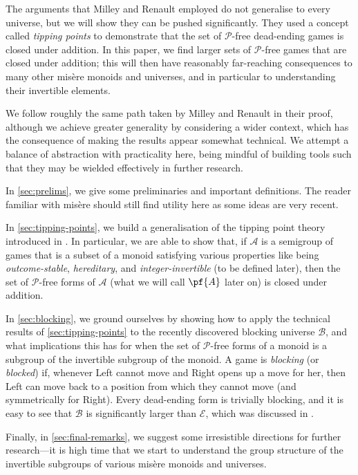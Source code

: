 \documentclass[11pt]{article}
\theoremstyle{definition}
\newcommand{\set}[1]{\mathcal{#1}}
\begin{document}
The arguments that Milley and Renault employed do not generalise to every
universe, but we will show they can be pushed significantly. They used a
concept called \emph{tipping points} to demonstrate that the set of
$\mathscr{P}$-free dead-ending games is closed under addition. In this paper,
we find larger sets of $\mathscr{P}$-free games that are closed under addition;
this will then have reasonably far-reaching consequences to many other mis\`ere
monoids and universes, and in particular to understanding their invertible
elements.

We follow roughly the same path taken by Milley and Renault in their proof,
although we achieve greater generality by considering a wider context, which
has the consequence of making the results appear somewhat technical. We attempt
a balance of abstraction with practicality here, being mindful of building
tools such that they may be wielded effectively in further research.

In \cref{sec:prelims}, we give some preliminaries and important definitions.
The reader familiar with mis\`ere should still find utility here as some ideas
are very recent.

In \cref{sec:tipping-points}, we build a generalisation of the tipping point
theory introduced in \cite{milley.renault:invertible}. In particular, we are
able to show that, if $\set{A}$ is a semigroup of games that is a subset of a
monoid satisfying various properties like being \emph{outcome-stable},
\emph{hereditary}, and \emph{integer-invertible} (to be defined later), then
the set of $\mathscr{P}$-free forms of $\set{A}$ (what we will call $\pf{A}$
later on) is closed under addition.

In \cref{sec:blocking}, we ground ourselves by showing how to apply the
technical results of \cref{sec:tipping-points} to the recently discovered
blocking universe $\set{B}$, and what implications this has for when the set of
$\mathscr{P}$-free forms of a monoid is a subgroup of the invertible subgroup
of the monoid. A game is \emph{blocking} (or \emph{blocked}) if, whenever Left
cannot move and Right opens up a move for her, then Left can move back to a
position from which they cannot move (and symmetrically for Right). Every
dead-ending form is trivially blocking, and it is easy to see that $\set{B}$ is
significantly larger than $\set{E}$, which was discussed in
\cite{davies.mckay.ea:pocancellation}.

Finally, in \cref{sec:final-remarks}, we suggest some irresistible directions
for further research---it is high time that we start to understand the group
structure of the invertible subgroups of various mis\`ere monoids and
universes.
\end{document}

